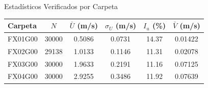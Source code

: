 \documentclass[aspectratio=169,12pt]{beamer}
\begin{document}
\begin{frame}{Estadísticos Verificados por Carpeta}
	\centering\small
	\begin{tabular}{l S[table-format=5.0]
			S[table-format=1.4] S[table-format=1.4]
			S[table-format=2.2] S[table-format=1.5]}
		\toprule
		\textbf{Carpeta}
		        & {$N$}              & {$\bar{U}$ (m/s)}
		        & {$\sigma_U$ (m/s)}
		        & {$I_u$ (\%)}
		        & {$\bar{V}$ (m/s)}                                                 \\
		\midrule
		FX01G00 & 30000              & 0.5086            & 0.0731 & 14.37 & 0.01422 \\
		FX02G00 & 29138              & 1.0133            & 0.1146 & 11.31 & 0.02078 \\
		FX03G00 & 30000              & 1.9633            & 0.2191 & 11.16 & 0.07125 \\
		FX04G00 & 30000              & 2.9255            & 0.3486 & 11.92 & 0.07639 \\
		\bottomrule
	\end{tabular}

	\vspace{0.5em}
\end{frame}
\end{document}
